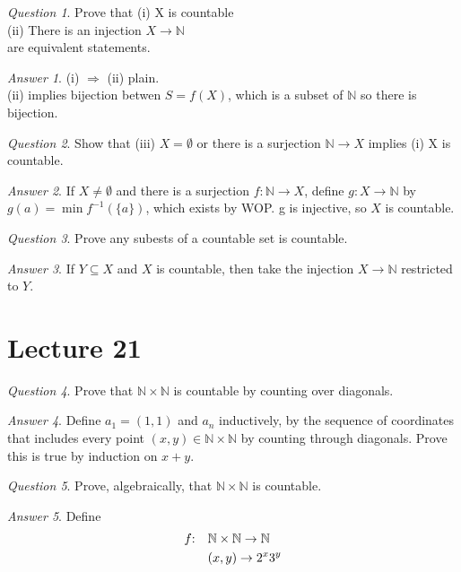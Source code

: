 \documentclass[]{article}
\def\naturals{\mathbb{N}}
\theoremstyle{remark}
\theoremstyle{qnstyle}
\newtheorem{question}{Question}
\theoremstyle{answerstyle}
\newtheorem*{answer}{Answer}
\begin{document}
\begin{question}
    Prove that
    (i) X is countable \\
    (ii) There is an injection $X \to \naturals$ \\
    are equivalent statements.
\end{question}
\begin{answer}
    (i) $\Rightarrow$ (ii) plain.\\
    (ii) implies bijection betwen $S = f(X)$, which is a subset of $\naturals$
    so there is bijection.
\end{answer}

\begin{question}
    Show that (iii) $X = \emptyset$ or there is a
    surjection $\naturals \to X$ implies (i) X is countable.
\end{question}
\begin{answer}
    If $X \not = \emptyset$ and there is a surjection
    $f: \naturals \to X$, define $g: X \to \naturals$ by
    $g(a) = \min f^{-1}(\{a\})$, which exists by WOP. g is injective, so $X$ is
    countable.
\end{answer}

\begin{question}
    Prove any subests of a countable set is countable.
\end{question}
\begin{answer}
    If $Y \subseteq X$ and $X$ is countable, then take the injection $X \to \naturals$ 
    restricted to $Y$.
\end{answer}





\section* {Lecture 21}

\begin{question}
    Prove that $\naturals \times \naturals$ is countable by counting over
    diagonals.
\end{question}
\begin{answer}
    Define $a_1 = (1,1)$ and $a_n$ inductively, by the sequence of coordinates that
    includes every point $(x,y) \in \naturals \times \naturals$ by counting through diagonals.
    Prove this is true by induction on $x+y$.
\end{answer}

\begin{question}
    Prove, algebraically, that $\naturals \times \naturals$ is countable.
\end{question}
\begin{answer}
    Define 
    \begin{align*}
        f\mkern-5mu: \quad & \naturals \times \naturals \to \naturals \\
                 & (x,y) \to 2^x 3^y
    \end{align*}
\end{answer}
\end{document}
